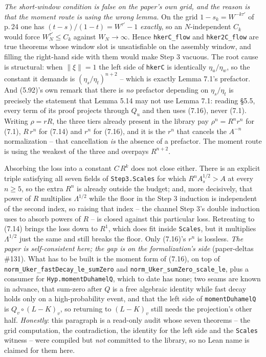 \begin{theorem}
  \emph{The short-window condition is false on the paper's own grid, and the reason is that the
  moment route is using the wrong lemma.}  On the grid $1-s_k=W^{-k\tau'}$ of p.\,24 one
  has $(t-s)/(1-t)=W^{\tau'}-1$ \emph{exactly}, so an $N$-independent $C_k$ would force
  $W_N^{\tau'}\le C_k$ against $W_N\to\infty$.  Hence \texttt{hkerC\_flow} and
  \texttt{hker2C\_flow} are true theorems whose window slot is unsatisfiable on the assembly
  window, and filling the right-hand side with them would make Step 3 vacuous.  The root cause is
  structural: when $\|\xi\|=1$ the left side of \texttt{hkerC} is identically $\eta_u/\eta_w$, so
  the constant it demands is $(\eta_s/\eta_t)^{n+2}$ -- which is exactly Lemma 7.1's prefactor.
  And (5.92)'s own remark that there is \emph{no} prefactor depending on $\eta_s/\eta_t$ is
  precisely the statement that Lemma 5.14 may not use Lemma 7.1: reading \S5.5, every term of its
  proof projects through $Q_u$ and then uses (7.16), never (7.1).  Writing $\rho=rR$, the three
  tiers already present in the library pay $\rho^n=R^nr^n$ for (7.1), $R\,r^n$ for (7.14) and
  $r^n$ for (7.16), and it is the $r^n$ that cancels the $A^{-n}$ normalization -- that
  cancellation \emph{is} the absence of a prefactor.  The moment route is using the weakest of the
  three and overpays $R^{n+2}$.

  Absorbing the loss into a constant $C\,R^k$ does not close either.  There is an explicit triple
  satisfying all seven fields of \texttt{Step3.Scales} for which $R^nA_s^{1/2}>A$ at every
  $n\ge5$, so the extra $R^n$ is already outside the budget; and, more decisively, that power of
  $R$ multiplies $\Lambda^{1/2}$ while the floor in the Step 3 induction is independent of the
  second index, so raising that index -- the channel Step 3's double induction uses to absorb
  powers of $R$ -- is closed against this particular loss.  Retreating to (7.14) brings the loss
  down to $R^1$, which does fit inside \texttt{Scales}, but it multiplies $\Lambda^{1/2}$ just the
  same and still breaks the floor.  Only (7.16)'s $r^n$ is lossless.  \emph{The paper is
  self-consistent here; the gap is on the formalization's side} (paper-deltas \#131).  What has to
  be built is the moment form of (7.16), on top of
  \texttt{norm\_Uker\_fastDecay\_le\_sumZero} and \texttt{norm\_Uker\_sumZero\_scale\_le}, plus a
  consumer for \texttt{Hyp.momentDuhamelQ}, which to date has none; two seams are known in
  advance, that sum-zero after $Q$ is a free algebraic identity while fast decay holds only on a
  high-probability event, and that the left side of \texttt{momentDuhamelQ} is $Q_v\circ(L-K)_v$,
  so returning to $(L-K)_v$ still needs the projection's other half.  \emph{Honestly}: this
  paragraph is a read-only audit whose seven theorems -- the grid computation, the contradiction,
  the identity for the left side and the \texttt{Scales} witness -- were compiled but
  \emph{not} committed to the library, so no Lean name is claimed for them here.
\end{theorem}
